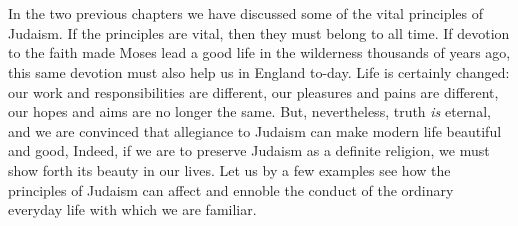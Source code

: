 \chapter{}

In the two previous chapters we have discussed
some of the vital principles of Judaism.
If the principles are vital, then they must
belong to all time. If devotion to the faith
made Moses lead a good life in the wilderness
thousands of years ago, this same
devotion must also help us in England to-day.
Life is certainly changed: our work
and responsibilities are different, our
pleasures and pains are different, our hopes
and aims are no longer the same. But,
nevertheless, truth \textsl{is} eternal, and we are
convinced that allegiance to Judaism can
make modern life beautiful and good, Indeed,
if we are to preserve Judaism as a
definite religion, we must show forth its
beauty in our lives. Let us by a few examples
see how the principles of Judaism
can affect and ennoble the conduct of the
ordinary everyday life with which we are
familiar.

